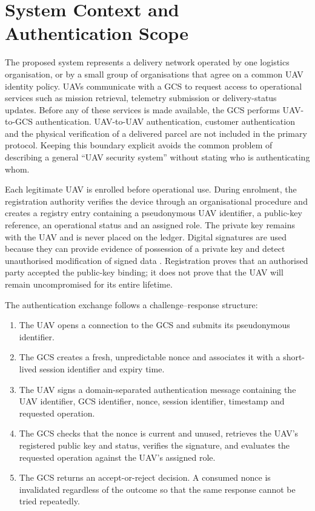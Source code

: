 \section{System Context and Authentication Scope}
\label{sec:system-context}

The proposed system represents a delivery network operated by one logistics organisation, or by a small group of organisations that agree on a common UAV identity policy. UAVs communicate with a GCS to request access to operational services such as mission retrieval, telemetry submission or delivery-status updates. Before any of these services is made available, the GCS performs UAV-to-GCS authentication. UAV-to-UAV authentication, customer authentication and the physical verification of a delivered parcel are not included in the primary protocol. Keeping this boundary explicit avoids the common problem of describing a general ``UAV security system'' without stating who is authenticating whom.

Each legitimate UAV is enrolled before operational use. During enrolment, the registration authority verifies the device through an organisational procedure and creates a registry entry containing a pseudonymous UAV identifier, a public-key reference, an operational status and an assigned role. The private key remains with the UAV and is never placed on the ledger. Digital signatures are used because they can provide evidence of possession of a private key and detect unauthorised modification of signed data \cite{NISTFIPS1865}. Registration proves that an authorised party accepted the public-key binding; it does not prove that the UAV will remain uncompromised for its entire lifetime.

The authentication exchange follows a challenge--response structure:

\begin{enumerate}
    \item The UAV opens a connection to the GCS and submits its pseudonymous identifier.
    \item The GCS creates a fresh, unpredictable nonce and associates it with a short-lived session identifier and expiry time.
    \item The UAV signs a domain-separated authentication message containing the UAV identifier, GCS identifier, nonce, session identifier, timestamp and requested operation.
    \item The GCS checks that the nonce is current and unused, retrieves the UAV's registered public key and status, verifies the signature, and evaluates the requested operation against the UAV's assigned role.
    \item The GCS returns an accept-or-reject decision. A consumed nonce is invalidated regardless of the outcome so that the same response cannot be tried repeatedly.
\end{enumerate}

